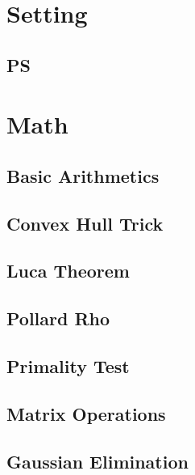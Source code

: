 \documentclass[10pt,landscape,a4paper,twocolumn]{article}
\begin{document}
\tableofcontents


\section{Setting}
\subsection{PS}



\section{Math}
\subsection{Basic Arithmetics}


\subsection{Convex Hull Trick}


\subsection{Luca Theorem}


\subsection{Pollard Rho}


\subsection{Primality Test}


\subsection{Matrix Operations}


\subsection{Gaussian Elimination}

\end{document}
